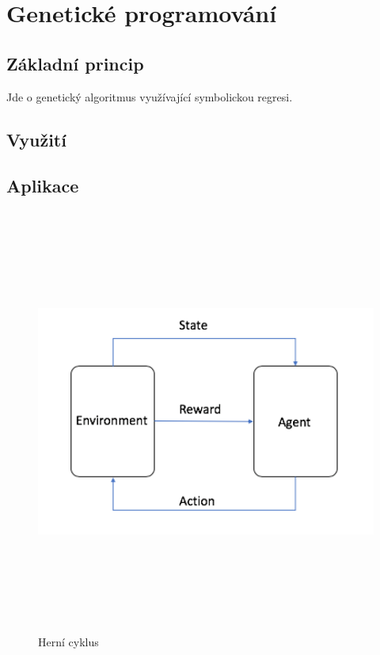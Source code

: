 
\chapter{Genetické programování}

\section{Základní princip}
Jde o genetický algoritmus využívající symbolickou regresi.

\section{Využití}

\section{Aplikace}





\begin{figure}[p]\centering
\includegraphics[width=140mm, height=140mm]{./agent_enviroment}
\caption{Herní cyklus}
\label{obr03:Nhust}
\end{figure}
